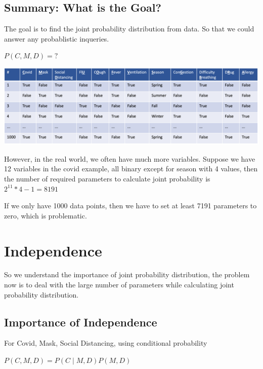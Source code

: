 \documentclass[11pt,a4paper]{report}
\begin{document}
\section{Summary: What is the Goal?}

The goal is to find the joint probability distribution from data. So that we could answer any probablistic inqueries.
\begin{center}
    $P(C, M, D) = ?$
\end{center}

\begin{center}
    \includegraphics[width=15cm, height=4cm]{covid_12var.png}
\end{center}

However, in the real world, we often have much more variables. Suppose we have 12 variables in the covid example, all binary except for season with 4 values, then the number of required parameters to calculate joint probability is $2^{11} * 4 - 1 = 8191$

If we only have 1000 data points, then we have to set at least 7191 parameters to zero, which is problematic.


\chapter{Independence}

So we understand the importance of joint probability distribution, the problem now is to deal with the large number of parameters while calculating joint probability distribution.

\section{Importance of Independence}

For Covid, Mask, Social Distancing, using conditional probability

\begin{center}
    $P(C, M, D) = P(C \mid M, D)P(M, D)$
\end{center}
\end{document}
